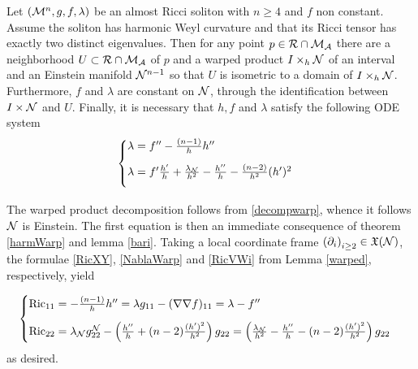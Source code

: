 \begin{teorema}\label{T31-REC}
	Let $\left(\mathcal{M}^n, g, f, \lambda\right)$ be an almost Ricci soliton with $n \geq 4$ and $f$ non constant. Assume the soliton has harmonic Weyl curvature and that its Ricci tensor has exactly two distinct eigenvalues. Then for any point $p\in\mathcal{R}\cap \mathcal{M}_{\mathcal{A}}$ there are a neighborhood $U\subset\mathcal{R}\cap \mathcal{M}_{\mathcal{A}}$ of $p$ and a warped product $I \times_{h} \mathcal{N}$ of an interval and an Einstein manifold $\mathcal{N}^{n-1}$ so that $U$ is isometric to a domain of $I \times_{h} \mathcal{N}$. Furthermore, $f$ and $\lambda$ are constant on $\mathcal{N}$, through the identification between $I \times \mathcal{N}$ and $U$. Finally, it is necessary that $h, f$ and $\lambda$ satisfy the following ODE system
	\begin{equation}\label{SistemaSimples} 
		\begin{cases}
		\lambda = f'' - \frac{(n-1)}{h} h'' \vspace{0.3cm}\\
		\lambda = f' \frac{h'}{h} + \frac{\lambda_{\nn}}{h^2} - \frac{h''}{h} - \frac{(n-2)}{h^2} (h')^2 \vspace{0.3cm} 
		\end{cases}
		\end{equation}

\end{teorema} 

\begin{demm}
	The warped product decomposition follows from \cref{decompwarp}, whence it follows $\mathcal{N}$ is Einstein. The first equation is then an immediate consequence of theorem \cref{harmWarp} and lemma \cref{bari}. Taking a local coordinate frame $\left(\partial_i\right)_{i \geq 2} \in \mathfrak{X}(\mathcal{N})$, the formulae \cref{RicXY}, \cref{NablaWarp} and \cref{RicVWi} from Lemma \cref{warped}, respectively, yield

	\[ \begin{cases}
\Ric_{11} = -\frac{(n-1)}{h}h'' = \lambda g_{11} - (\nabla \nabla f)_{11} = \lambda - f'' \vspace{0.3cm} \\
\Ric_{22} = \lambda_{\nn} g^{\nn}_{22}  - \pa{\frac{h''}{h} + (n-2) \frac{(h')^2}{h^2} } g_{22}  = \pa{ \frac{ \lambda_{\nn}}{h^2}- \frac{h''}{h} -(n-2) \frac{(h')^2}{h^2}  } g_{22}\\
\end{cases}
\]
as desired.

   \end{demm}


